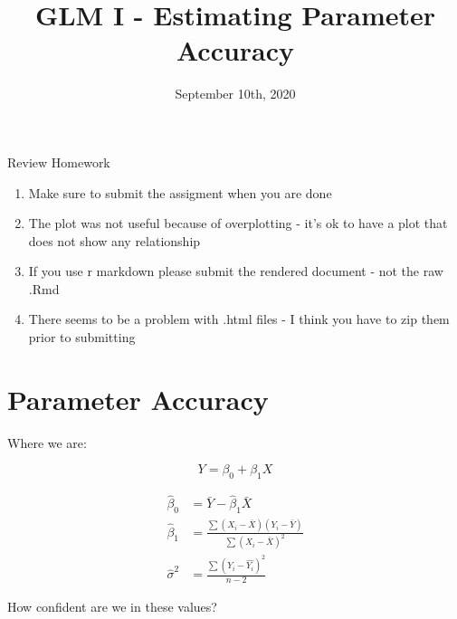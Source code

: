 \documentclass[
  ignorenonframetext,
]{beamer}
\title{GLM I - Estimating Parameter Accuracy}
\subtitle{September 10th, 2020}
\author{}
\date{\vspace{-2.5em}}
\providecommand{\tightlist}{%
  \setlength{\itemsep}{0pt}\setlength{\parskip}{0pt}}
\begin{document}
\frame{\titlepage}

\begin{frame}{Review Homework}
\protect\hypertarget{review-homework}{}

\begin{enumerate}
\tightlist
\item
  Make sure to submit the assigment when you are done
\item
  The plot was not useful because of overplotting - it's ok to have a
  plot that does not show any relationship
\item
  If you use r markdown please submit the rendered document - not the
  raw .Rmd
\item
  There seems to be a problem with .html files - I think you have to zip
  them prior to submitting
\end{enumerate}

\end{frame}

\hypertarget{parameter-accuracy}{%
\section{Parameter Accuracy}\label{parameter-accuracy}}

\begin{frame}{Where we are:}
\protect\hypertarget{where-we-are}{}

\[
Y = \beta_0 + \beta_1X
\]

\[
\begin{aligned}
\hat\beta_0 &= \bar{Y} - \hat\beta_1\bar{X} \\
\hat\beta_1 &= \frac{\sum{(X_i - \bar{X})(Y_i - \bar{Y})}}{\sum{(X_i - \bar{X})^2}} \\
\hat{\sigma}^2 &= \frac{\sum{(Y_i - \hat{Y_i})^2}}{n-2}
\end{aligned}
\]

\end{frame}

\begin{frame}{How confident are we in these values?}
\protect\hypertarget{how-confident-are-we-in-these-values}{}

\end{frame}
\end{document}
